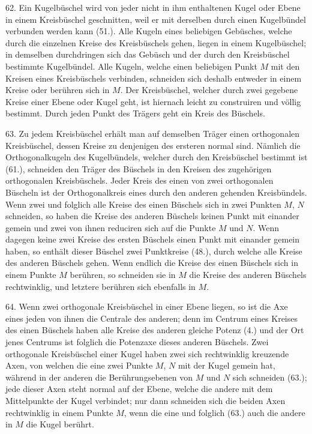 62. Ein Kugelb\"uschel wird von jeder nicht in ihm enthaltenen
Kugel oder Ebene in einem Kreisb\"uschel geschnitten,
weil er mit derselben durch einen Kugelb\"undel verbunden
werden kann (51.). Alle Kugeln eines beliebigen Geb\"usches,
welche durch die einzelnen Kreise des Kreisb\"uschels
gehen, liegen in einem Kugelb\"uschel; in demselben durchdringen
sich das Geb\"usch und der durch den Kreisb\"uschel
bestimmte Kugelb\"undel. Alle Kugeln, welche einen beliebigen
Punkt $M$ mit den Kreisen eines Kreisb\"uschels verbinden,
schneiden sich deshalb entweder in einem Kreise
oder ber\"uhren sich in $M$. Der Kreisb\"uschel, welcher durch
zwei gegebene Kreise einer Ebene oder Kugel geht, ist hiernach
leicht zu construiren und v\"ollig bestimmt. Durch jeden
Punkt des Tr\"agers geht ein Kreis des B\"uschels.

63. Zu jedem Kreisb\"uschel erh\"alt man auf demselben
Tr\"ager einen {\glqq}orthogonalen{\grqq} Kreisb\"uschel, dessen Kreise zu
denjenigen des ersteren normal sind. N\"amlich die Orthogonalkugeln
des Kugelb\"undels, welcher durch den Kreisb\"uschel
bestimmt ist (61.), schneiden den Tr\"ager des B\"uschels in
den Kreisen des zugeh\"origen orthogonalen Kreisb\"uschels.
Jeder Kreis des einen von zwei orthogonalen B\"uscheln ist
der Orthogonalkreis eines durch den anderen gehenden Kreisb\"undels.
Wenn zwei und folglich alle Kreise des einen
B\"uschels sich in zwei Punkten $M$, $N$ schneiden, so haben
die Kreise des anderen B\"uschels keinen Punkt mit einander
gemein und zwei von ihnen reduciren sich auf die Punkte $M$
und $N$. Wenn dagegen keine zwei Kreise des ersten B\"uschels
einen Punkt mit einander gemein haben, so enth\"alt dieser
B\"uschel zwei Punktkreise (48.), durch welche alle Kreise des
anderen B\"uschels gehen. Wenn endlich die Kreise des einen
B\"uschels sich in einem Punkte $M$ ber\"uhren, so schneiden
sie in $M$ die Kreise des anderen B\"uschels rechtwinklig, und
letztere ber\"uhren sich ebenfalls in $M$.

64. Wenn zwei orthogonale Kreisb\"uschel in einer Ebene
liegen, so ist die Axe eines jeden von ihnen die Centrale
des anderen; denn im Centrum eines Kreises des einen B\"uschels
haben alle Kreise des anderen gleiche Potenz (4.)
und der Ort jenes Centrums ist folglich die Potenzaxe dieses
anderen B\"uschels. Zwei orthogonale Kreisb\"uschel einer
Kugel haben zwei sich rechtwinklig kreuzende Axen, von
welchen die eine zwei Punkte $M$, $N$ mit der Kugel gemein
hat, w\"ahrend in der anderen die Ber\"uhrungsebenen von $M$
und $N$ sich schneiden (63.); jede dieser Axen steht normal
auf der Ebene, welche die andere mit dem Mittelpunkte der
Kugel verbindet; nur dann schneiden sich die beiden Axen
rechtwinklig in einem Punkte $M$, wenn die eine und folglich
(63.) auch die andere in $M$ die Kugel ber\"uhrt.

